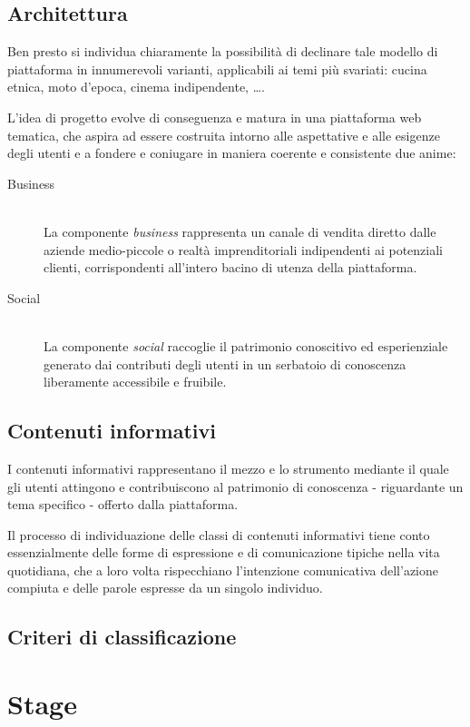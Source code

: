 \documentclass[12pt,a4paper,headsepline,hidelinks]{scrreprt} %
\begin{document}
	\section{Architettura}
	Ben presto si individua chiaramente la possibilità di declinare tale modello di piattaforma in innumerevoli varianti, applicabili ai temi più svariati: cucina etnica, moto d'epoca, cinema indipendente, \ldots .

	L'idea di progetto evolve di conseguenza e matura in una piattaforma web tematica, che aspira ad essere costruita intorno alle aspettative e alle esigenze degli utenti e a fondere e coniugare in maniera coerente e consistente due anime:
	\begin{description}
	\item[Business] \hfill \\
	La componente \textit{business} rappresenta un canale di vendita diretto dalle aziende medio-piccole o realtà imprenditoriali indipendenti ai potenziali clienti, corrispondenti all'intero bacino di utenza della piattaforma.
	\item[Social] \hfill \\
	La componente \textit{social} raccoglie il patrimonio conoscitivo ed esperienziale generato dai contributi degli utenti in un serbatoio di conoscenza liberamente accessibile e fruibile.
	\end{description}

	\section{Contenuti informativi}
	I contenuti informativi rappresentano il mezzo e lo strumento mediante il quale gli utenti attingono e contribuiscono al patrimonio di conoscenza - riguardante un tema specifico - offerto dalla piattaforma.

	Il processo di individuazione delle classi di contenuti informativi tiene conto essenzialmente delle forme di espressione e di comunicazione tipiche nella vita quotidiana, che a loro volta rispecchiano l'intenzione comunicativa dell'azione compiuta e delle parole espresse da un singolo individuo.

	\section{Criteri di classificazione}

	\chapter{Stage}
\end{document}
